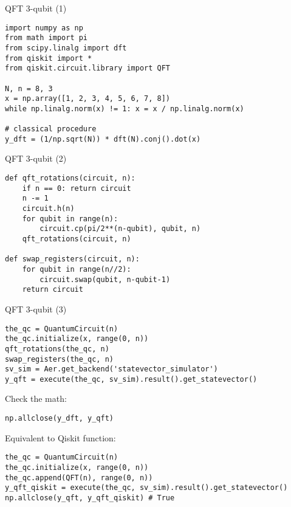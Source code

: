 \begin{frame}[fragile]{QFT 3-qubit (1)}
\begin{verbatim}
import numpy as np
from math import pi
from scipy.linalg import dft
from qiskit import * 
from qiskit.circuit.library import QFT

N, n = 8, 3
x = np.array([1, 2, 3, 4, 5, 6, 7, 8])
while np.linalg.norm(x) != 1: x = x / np.linalg.norm(x)

# classical procedure
y_dft = (1/np.sqrt(N)) * dft(N).conj().dot(x)
\end{verbatim}
\end{frame}


\begin{frame}[fragile]{QFT 3-qubit (2)}
\begin{verbatim}
def qft_rotations(circuit, n):
    if n == 0: return circuit
    n -= 1
    circuit.h(n)
    for qubit in range(n):
        circuit.cp(pi/2**(n-qubit), qubit, n)
    qft_rotations(circuit, n)
    
def swap_registers(circuit, n):
    for qubit in range(n//2):
        circuit.swap(qubit, n-qubit-1)
    return circuit
\end{verbatim}
\end{frame}

\begin{frame}[fragile]{QFT 3-qubit (3)}
\begin{verbatim}
the_qc = QuantumCircuit(n)
the_qc.initialize(x, range(0, n))
qft_rotations(the_qc, n)
swap_registers(the_qc, n)
sv_sim = Aer.get_backend('statevector_simulator')
y_qft = execute(the_qc, sv_sim).result().get_statevector()
\end{verbatim}

\smallskip Check the math:
\begin{verbatim}
np.allclose(y_dft, y_qft)
\end{verbatim}

\smallskip Equivalent to Qiskit function:
\begin{verbatim}
the_qc = QuantumCircuit(n)
the_qc.initialize(x, range(0, n))
the_qc.append(QFT(n), range(0, n))
y_qft_qiskit = execute(the_qc, sv_sim).result().get_statevector()
np.allclose(y_qft, y_qft_qiskit) # True
\end{verbatim}
\end{frame}